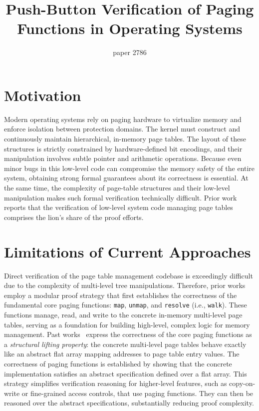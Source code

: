 \documentclass[sigplan,nonacm,10pt]{acmart}
\begin{document}
\date{}

\title{Push-Button Verification of Paging Functions in Operating Systems}

\author{{\rm paper 2786}} %

\maketitle

\section*{Motivation}
Modern operating systems rely on paging hardware to virtualize memory and enforce isolation between protection domains. The kernel must construct and continuously maintain hierarchical, in-memory page tables. The layout of these structures is strictly constrained by hardware-defined bit encodings, and their manipulation involves subtle pointer and arithmetic operations. Because even minor bugs in this low-level code can compromise the memory safety of the entire system, obtaining strong formal guarantees about its correctness is essential. At the same time, the complexity of page-table structures and their low-level manipulation makes such formal verification technically difficult. Prior work~\cite{brun23hotos} reports that the verification of low-level system code managing page tables comprises the lion's share of the proof efforts.

\section*{Limitations of Current Approaches}
Direct verification of the page table management codebase is exceedingly difficult due to the complexity of multi-level tree manipulations. Therefore, prior works~\cite{li:ieeesp2021,brun23hotos,li:sekvm:usenix21} employ a modular proof strategy that first establishes the correctness of the fundamental core paging functions: \texttt{map}, \texttt{unmap}, and \texttt{resolve} (i.e., \texttt{walk}). These functions manage, read, and write to the concrete in-memory multi-level page tables, serving as a foundation for building high-level, complex logic for memory management. Past works~\cite{li:ieeesp2021,brun23hotos,li:sekvm:usenix21} express the correctness of the core paging functions as a \textit{structural lifting property}: the concrete multi-level page tables behave exactly like an abstract flat array mapping addresses to page table entry values. %
The correctness of paging functions is established by showing that the concrete implementation satisfies an abstract specification defined over a flat array. This strategy simplifies verification reasoning for higher-level features, such as copy-on-write or fine-grained access controls, that use paging functions. They can then be reasoned over the abstract specifications, substantially reducing proof complexity.
\end{document}
